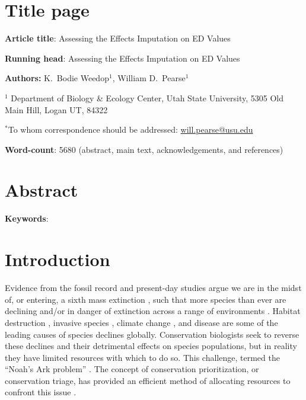 \documentclass[12pt,english]{article}
\begin{document}
\setlength{\parindent}{0pt}
\section*{Title page}

\textbf{Article title}: Assessing the Effects Imputation on ED Values

\textbf{Running head}: Assessing the Effects Imputation on ED Values

\textbf{Authors:} K.\ Bodie Weedop$^{1}$, William D.\ Pearse$^{1}$\

$^1$ Department of Biology \& Ecology Center, Utah State University,
5305 Old Main Hill, Logan UT, 84322

$^*$To whom correspondence should be addressed:
\url{will.pearse@usu.edu}

\textbf{Word-count}: 5680 (abstract, main text, acknowledgements, and
  references)

\clearpage
\section*{Abstract}


\textbf{Keywords}: 

\clearpage
\section*{Introduction}
Evidence from the fossil record and present-day studies argue we are in the
midst of, or entering, a sixth mass extinction
\autocite{Barnosky2011, Ceballos2015}, such that more species than ever are
declining and/or in danger of extinction across a range of environments
\autocite{Wake2008,Thomas2004}. Habitat destruction
\autocite{Brooks2002}, invasive species \autocite{Molnar2008}, climate change
\autocite{Pounds2006}, and disease \autocite{Lips2006} are some of the leading
causes of species declines globally. Conservation biologists seek to reverse
these declines and their detrimental effects on species populations, but in
reality they have limited resources with which to do so. This challenge, termed
the ``Noah's Ark problem'' \autocite{Weitzman1998}. The concept of conservation
prioritization, or conservation triage, has provided an efficient method of
allocating resources to confront this issue \autocite{Bottrill2008}. 
\end{document}
